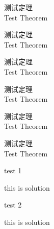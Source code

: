 \documentclass[cn]{../../styles/book/elegantbook/elegantbook}
\begin{document}
\begin{note}
测试定理 \\
Test Theorem
\end{note}

\begin{conclusion}
测试定理 \\
Test Theorem
\end{conclusion}


\begin{assumption}
测试定理 \\
Test Theorem
\end{assumption}

\begin{property}
测试定理 \\
Test Theorem
\end{property}

\begin{remark}
测试定理 \\
Test Theorem
\end{remark}

\begin{solution}
测试定理 \\
Test Theorem
\end{solution}

\begin{problemset}
\item test 1
\begin{solution}
this is solution
\end{solution}
\item test 2
\begin{solution}
this is solution
\end{solution}
\end{problemset}
\end{document}
